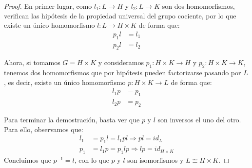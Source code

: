 \begin{teo}
   \begin{proof}
       En primer lugar, como $l_1:L\to H$ y $l_2:L\to K$ son dos homomorfismos, verifican las hipótesis de la propiedad universal del grupo cociente, por lo que existe un único homomorfismo $l:L\to H\times K$ de forma que:
       \begin{align*}
           p_1l &= l_1 \\
           p_2l &= l_2
       \end{align*}
       \begin{figure}[H]
           \centering
       \end{figure}
       \noindent
       Ahora, si tomamos $G = H\times K$ y consideramos $p_1:H\times K\to H$ y $p_2:H\times K\to K$, tenemos dos homomorfismos que por hipótesis pueden factorizarse pasando por $L$, es decir, existe un único homomorfismo $p:H\times K\to L$ de forma que:
       \begin{align*}
           l_1p &= p_1 \\
           l_2p &= p_2
       \end{align*}
       \begin{figure}[H]
           \centering
       \end{figure}
       \noindent
       Para terminar la demostración, basta ver que $p$ y $l$ son inversos el uno del otro. Para ello, observamos que:
       \begin{align*}
           l_1 &= p_1l = l_1pl \Longrightarrow pl = id_{L} \\
           p_1 &= l_1p = p_1lp \Longrightarrow lp = id_{H\times K}
       \end{align*}
       Concluimos que $p^{-1} = l$, con lo que $p$ y $l$ son isomorfismos y $L\cong H\times K$.
   \end{proof}
\end{teo}

